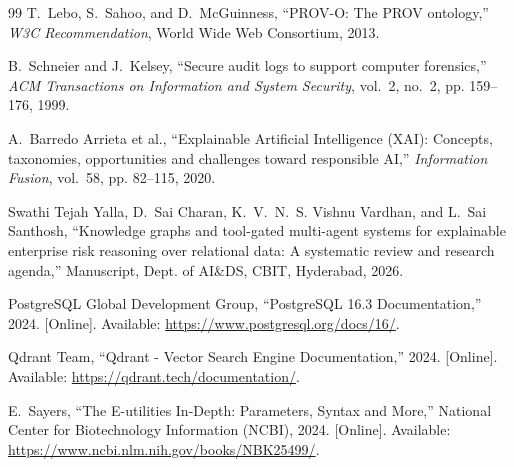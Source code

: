 \documentclass[12pt,a4paper]{report}
\begin{document}
\begin{thebibliography}{99}
T.~Lebo, S.~Sahoo, and D.~McGuinness, ``PROV-O: The PROV ontology,'' \emph{W3C Recommendation}, World Wide Web Consortium, 2013.

B.~Schneier and J.~Kelsey, ``Secure audit logs to support computer forensics,'' \emph{ACM Transactions on Information and System Security}, vol.~2, no.~2, pp. 159--176, 1999.

A.~Barredo Arrieta et al., ``Explainable Artificial Intelligence (XAI): Concepts, taxonomies, opportunities and challenges toward responsible AI,'' \emph{Information Fusion}, vol.~58, pp. 82--115, 2020.

Swathi Tejah Yalla, D.~Sai Charan, K.~V.~N.~S. Vishnu Vardhan, and L.~Sai Santhosh, ``Knowledge graphs and tool-gated multi-agent systems for explainable enterprise risk reasoning over relational data: A systematic review and research agenda,'' Manuscript, Dept. of AI\&DS, CBIT, Hyderabad, 2026.

PostgreSQL Global Development Group, ``PostgreSQL 16.3 Documentation,'' 2024. [Online]. Available: \url{https://www.postgresql.org/docs/16/}.

Qdrant Team, ``Qdrant - Vector Search Engine Documentation,'' 2024. [Online]. Available: \url{https://qdrant.tech/documentation/}.

E.~Sayers, ``The E-utilities In-Depth: Parameters, Syntax and More,'' National Center for Biotechnology Information (NCBI), 2024. [Online]. Available: \url{https://www.ncbi.nlm.nih.gov/books/NBK25499/}.

\end{thebibliography}
\end{document}
